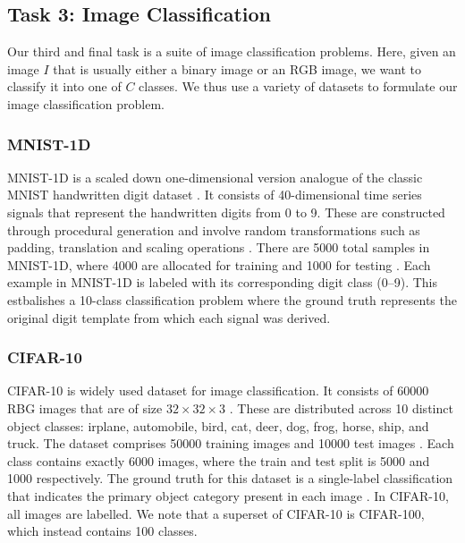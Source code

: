 \subsection{Task 3: Image Classification}
\label{ssec:task_3_image_classification}

Our third and final task is a suite of image classification problems. Here, given an image $I$ that is usually either a binary image or an RGB image, we want to classify it into one of $C$ classes. We thus use a variety of datasets to formulate our image classification problem.

\subsubsection{MNIST-1D}
\label{sssec:task_3_mnist_1d}
MNIST-1D is a scaled down one-dimensional version analogue of the classic MNIST handwritten digit dataset \citep{greydanus_mnist1d}. It consists of 40-dimensional time series signals that represent the handwritten digits from 0 to 9. These are constructed through procedural generation and involve random transformations such as padding, translation and scaling operations \citep{greydanus_mnist1d}. There are 5000 total samples in MNIST-1D, where 4000 are allocated for training and 1000 for testing \citep{greydanus_mnist1d}. Each example in MNIST-1D is labeled with its corresponding digit class (0--9). This estbalishes a 10-class classification problem where the ground truth represents the original digit template from which each signal was derived.

\subsubsection{CIFAR-10}
\label{sssec:task_3_cifar_10}
CIFAR-10 is widely used dataset for image classification. It consists of 60000 RBG images that are of size $32 \times 32 \times 3$ \citep{cifar10}. These are distributed across 10 distinct object classes: irplane, automobile, bird, cat, deer, dog, frog, horse, ship, and truck. The dataset comprises 50000 training images and 10000 test images \citep{cifar10}. Each class contains exactly 6000 images, where the train and test split is 5000 and 1000 respectively. The ground truth for this dataset is a single-label classification that indicates the primary object category present in each image \citep{cifar10}. In CIFAR-10, all images are labelled. We note that a superset of CIFAR-10 is CIFAR-100, which instead contains 100 classes. 

